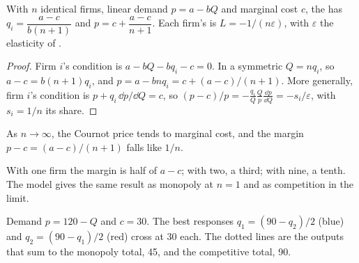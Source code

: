 \begin{proposition}\label{prop:b1:cournot-and-bertrand:n-firms}
With $n$ identical firms, linear demand $p = a - bQ$ and marginal cost $c$, the
 has $q_i = \dfrac{a - c}{b(n + 1)}$ and
$p = c + \dfrac{a - c}{n + 1}$. Each firm's  is $L = -1/(n\varepsilon)$, with $\varepsilon$
the elasticity of .
\end{proposition}

\begin{proof}
Firm $i$'s condition is $a - bQ - bq_i - c = 0$. In a symmetric 
$Q = nq_i$, so $a - c = b(n + 1)q_i$, and $p = a - bnq_i = c + (a - c)/(n + 1)$. More
generally, firm $i$'s condition is $p + q_i\,\dd p/\dd Q = c$, so
$(p - c)/p = -\frac{q_i}{Q}\frac Qp\frac{\dd p}{\dd Q} = -s_i/\varepsilon$, with $s_i = 1/n$ its share.
\end{proof}

\begin{proposition}\label{prop:b1:cournot-and-bertrand:limit}
As $n \to \infty$, the Cournot price tends to marginal cost, and the margin
$p - c = (a - c)/(n + 1)$ falls like $1/n$.
\end{proposition}

With one firm the margin is half of $a - c$; with two, a third; with nine, a
tenth. The model gives the same result as monopoly at $n = 1$ and as
competition in the limit.

\begin{omfigure}

{\small Demand $p = 120 - Q$ and $c = 30$. The best responses
$q_1 = (90 - q_2)/2$ (blue) and $q_2 = (90 - q_1)/2$ (red) cross at 30 each. The dotted lines
are the outputs that sum to the monopoly total, 45, and the competitive
total, 90.}
\end{omfigure}

